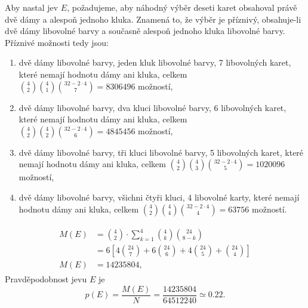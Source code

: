 \begin{mdframed}[style=mdexam]
\begin{example}
      Aby nastal jev \(E\), požadujeme, aby náhodný výběr deseti karet obsahoval právě dvě dámy a
      alespoň jednoho kluka. Znamená to, že výběr je příznivý, obsahuje-li dvě dámy libovolné barvy
      a současně alespoň jednoho kluka libovolné barvy. Příznivé možnosti tedy jsou:
      \begin{enumerate}[leftmargin=10pt,noitemsep]
        \item  dvě dámy libovolné barvy, jeden kluk libovolné barvy, \num{7}
              libovolných karet, které nemají hodnotu dámy ani kluka, celkem 
              \(\binom{4}{2}\binom{4}{1}\binom{32-2\cdot4}{7} = \num{8306496}\) možností,
        \item dvě dámy libovolné barvy, dva kluci libovolné barvy, \num{6}
              libovolných karet, které nemají hodnotu dámy ani kluka, celkem 
              \(\binom{4}{2}\binom{4}{2}\binom{32-2\cdot4}{6} = \num{4845456}\) možností,
        \item dvě dámy libovolné barvy, tři kluci libovolné barvy, \num{5}
              libovolných karet, které nemají hodnotu dámy ani kluka, celkem 
              \(\binom{4}{2}\binom{4}{3}\binom{32-2\cdot4}{5} = \num{1020096}\) možností,
        \item dvě dámy libovolné barvy, všichni čtyři kluci, \num{4} libovolné karty, které nemají
              hodnotu dámy ani kluka, celkem 
              \(\binom{4}{2}\binom{4}{4}\binom{32-2\cdot4}{4} = \num{63756}\) možností.
      \end{enumerate}
      \begin{gather*}     
        \begin{align*}
          M(E) &= \binom{4}{2}\cdot\sum^{4}_{k=1}\binom{4}{k}\binom{24}{8 - k}                    \\
               &= 6\left[4\binom{24}{7} + 6\binom{24}{6} + 4\binom{24}{5} + \binom{24}{4}\right]  \\ 
          M(E) &= \num{14235804}, 
        \end{align*}
      \end{gather*}
      Pravděpodobnost jevu \(E\) je
      \begin{equation*}
        p(E) = \dfrac{M(E)}{N} = \dfrac{\num{14235804}}{\num{64512240}} \simeq \num{0.22}.
      \end{equation*}


\end{example}
\end{mdframed}
